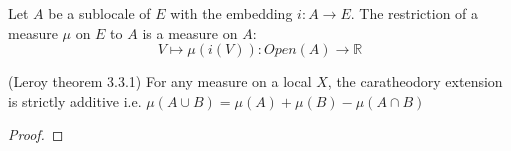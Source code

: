 \begin{lemma}
    Let $A$ be a sublocale of $E$ with the embedding $i : A \rightarrow E$. The restriction of a measure $\mu$ on $E$ to $A$ is a measure on $A$:
    $$V \mapsto \mu(i(V)) : Open(A) \to \mathbb{R}$$
    \label{lem:restriction_to_sublocale}
    \leanok
\end{lemma}

\begin{comment}
\begin{proposition}[Elementary Properties of Caratheodory Extensions]
(Leroy lemme 3.3, 3.4, Corollary 3.1, Lemme 3.5)
    \label{prop:elementary_properties_of_caratheodory_extensions}
    \uses{lem:measure_add_compl_eq_top,lem:restrict_add_compl_eq_top,lem:commutes_with_sup, lem:restrict_preserves_sSup,lem:monotonic}
    For any measure on a local $X$, the caratheodory extension satisfies the following properties:
    \begin{enumerate}
        \item It is monotonic i.e. \[A \le B \implies \mu (A) \le \mu (B)\]
        \item Commutes with unions of increasing families
        \item $\mu(U) + \mu(X \setminus U) = \mu(X)$
        \item $\mu(A) = \mu(A \cap U) + \mu(A \cap(E\setminus U))$
        \item For a increasing family $V_{\alpha}$ of open sublocals of $E$ and any sublocal $A$, we have:
        \[\mu(A \cap(\bigcup V_{\alpha})) = \sup_\alpha \mu(A\cap V_\alpha)\]
        \item For any measure on a local $X$ and a decreasing family $V_i$ of open sublocals, the caratheodory extension fulfills: $\mu (\inf V_i) = \inf \mu(V_i)$.
    \end{enumerate}
    In particular, for two open sublocals $U$ and $V$ of $X$ and any sublocal $A$ of $X$, we have
    \[\mu(A \cap (U \cup V)) = \mu(A\cap U) + \mu(A\cap V) - \mu(A \cap U \cap V)\]
\end{proposition}
\end{comment}


\begin{proposition}
(Leroy theorem 3.3.1)
    \label{prop:strictly_additive}
    \leanok
    For any measure on a local $X$, the caratheodory extension is
    strictly additive i.e. $\mu (A \cup B) = \mu(A) + \mu(B) - \mu(A \cap B)$
\end{proposition}
\begin{proof}
    \leanok
\end{proof}


